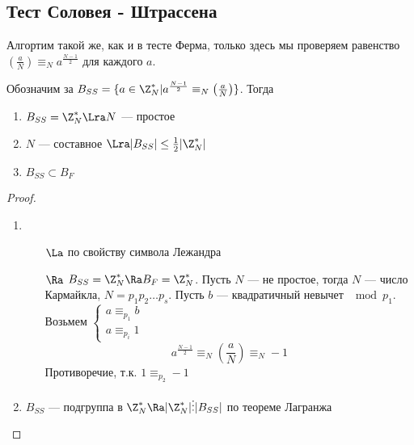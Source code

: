 \subsection{Тест Соловея - Штрассена}
Алгортим такой же, как и в тесте Ферма, только здесь мы проверяем равенство \(\left(\frac{a}{N}\right) \equiv_N a^{\frac{N - 1}{2}}\) для каждого \(a\).
\begin{theorem}
    Обозначим за \(B_{SS} = \{a \in \Z_N^* | a^{\frac{N - 1}{2}} \equiv_N \left(\frac{a}{N}\right)\}\). Тогда
    \begin{enumerate}
        \item \(B_{SS} = \Z_N^* \Lra N\) --- простое
        \item \(N\) --- составное \(\Lra |B_{SS}| \le \frac{1}{2}|\Z_N^*|\)
        \item \(B_{SS} \subset B_F\)
    \end{enumerate}
\end{theorem}
\begin{proof}\indent
    \begin{enumerate}
        \item \begin{enumerate}
            \item[\(\La\)] по свойству символа Лежандра 
            \item[\(\Ra\)] \(B_{SS} = \Z_N^* \Ra B_F = \Z_N^*\). Пусть \(N\) --- не простое, тогда \(N\) --- число Кармайкла, \(N = p_1p_2\dots p_s\). Пусть \(b\) --- квадратичный невычет \(\mod p_1\). Возьмем \(\left\{\begin{array}{l}
                a \equiv_{p_1} b \\
                a \equiv_{p_i} 1
            \end{array}\right.\)
            \[a^{\frac{N - 1}{2}} \equiv_N \left(\frac{a}{N}\right) \equiv_N -1\]
            Противоречие, т.к. \(1 \equiv_{p_2} -1\)
        \end{enumerate}
        \item \(B_{SS}\) --- подгруппа в \(\Z_N^* \Ra |\Z_N^*|\vdots|B_{SS}|\) по теореме Лагранжа
    \end{enumerate}
\end{proof}
